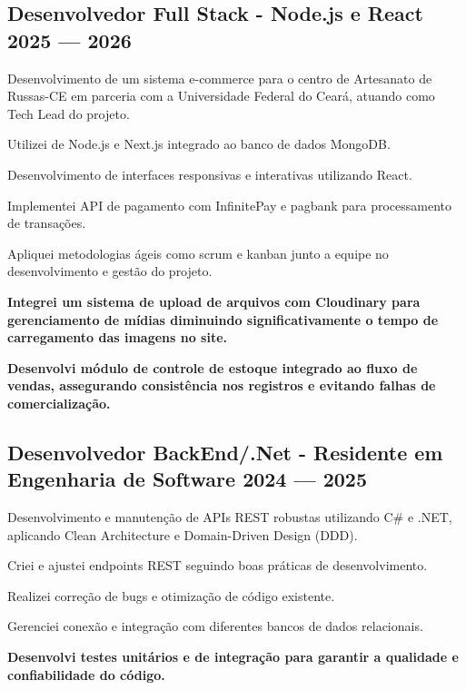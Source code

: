 \subsection{{Desenvolvedor Full Stack - Node.js e React \hfill 2025 --- 2026}}
\begin{zitemize}
    \item Desenvolvimento de um sistema e-commerce para o centro de Artesanato de Russas-CE em parceria com a Universidade Federal do Ceará, atuando como Tech Lead do projeto.
    \item Utilizei de Node.js e Next.js integrado ao banco de dados MongoDB.
    \item Desenvolvimento de interfaces responsivas e interativas utilizando React.
    \item Implementei API de pagamento com InfinitePay e pagbank para processamento de transações.
    \item Apliquei metodologias ágeis como scrum e kanban junto a equipe no desenvolvimento e gestão do projeto.
    \item \textbf{Integrei um sistema de upload de arquivos com Cloudinary para gerenciamento de mídias
        diminuindo significativamente o tempo de carregamento das imagens no site.}
    \item \textbf{Desenvolvi módulo de controle de estoque integrado ao fluxo de vendas, assegurando consistência nos registros e evitando falhas de comercialização.}
\end{zitemize}

\subsection{{Desenvolvedor BackEnd/.Net - Residente em Engenharia de Software \hfill 2024 --- 2025}}
\begin{zitemize}
    \item Desenvolvimento e manutenção de APIs REST robustas utilizando C# e .NET, aplicando Clean Architecture e Domain-Driven Design (DDD).\item Criei e ajustei endpoints REST seguindo boas práticas de desenvolvimento.
    \item Realizei correção de bugs e otimização de código existente.
    \item Gerenciei conexão e integração com diferentes bancos de dados relacionais.
    \item \textbf{Desenvolvi testes unitários e de integração para garantir a qualidade e confiabilidade do código.}
\end{zitemize}

